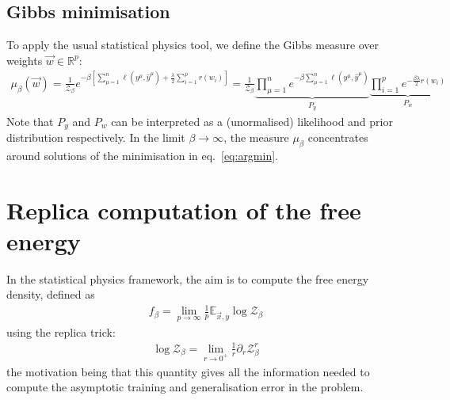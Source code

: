 \documentclass[11pt]{article}
\numberwithin{equation}{section}
\begin{document}
\subsection*{Gibbs minimisation}
To apply the usual statistical physics tool, we define the Gibbs measure over weights $\vec{w}\in\mathbb{R}^{p}$:
\begin{align}
\mu_{\beta}(\vec{w}) = \frac{1}{\mathcal{Z}_{\beta}} e^{-\beta\left[\sum\limits_{\mu=1}^{n}\ell\left(y^{\mu},\hat{y}^{\mu}\right)+\frac{\lambda}{2}\sum\limits_{i=1}^{p}r(w_{i})\right]}	= \frac{1}{\mathcal{Z}_{\beta}}\underbrace{\prod\limits_{\mu=1}^{n} e^{-\beta\sum\limits_{\mu=1}^{n}\ell\left(y^{\mu},\hat{y}^{\mu}\right)}}_{P_{y}}\underbrace{\prod\limits_{i=1}^{p}e^{-\frac{\beta\lambda}{2}r(w_{i})}}_{P_{w}}
\end{align}
Note that $P_{y}$ and $P_{w}$ can be interpreted as a (unormalised) likelihood and prior distribution respectively. In the limit $\beta\to\infty$, the measure $\mu_{\beta}$ concentrates around solutions of the minimisation in eq.~\eqref{eq:argmin}.

\section{Replica computation of the free energy}
In the statistical physics framework, the aim is to compute the free energy density, defined as
\begin{align}
f_{\beta} = \lim\limits_{p\to\infty}\frac{1}{p}\mathbb{E}_{\vec{x}, y}\log\mathcal{Z}_{\beta}	
\end{align}
\noindent using the replica trick:
\begin{align}
	\log\mathcal{Z}_{\beta}	= \lim\limits_{r\to 0^{+}}\frac{1}{r}\partial_{r}\mathcal{Z}^{r}_{\beta}
\end{align}
\noindent the motivation being that this quantity gives all the information needed to compute the asymptotic training and generalisation error in the problem.

\end{document}
